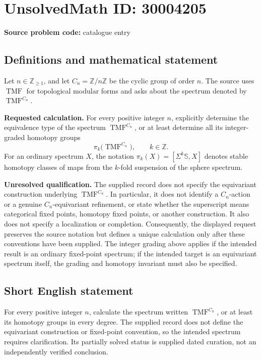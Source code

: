 \documentclass[11pt]{article}
\newcommand{\Z}{\mathbb{Z}}
\begin{document}
\section*{UnsolvedMath ID: 30004205}
\textbf{Source problem code:} catalogue entry
\subsection{Definitions and mathematical statement}
Let \(n\in\Z_{\geq 1}\), and let \(C_n=\Z/n\Z\) be the cyclic group of order \(n\). The source uses \(\operatorname{TMF}\) for topological modular forms and asks about the spectrum denoted by \(\operatorname{TMF}^{C_n}\).

\textbf{Requested calculation.} For every positive integer \(n\), explicitly determine the equivalence type of the spectrum \(\operatorname{TMF}^{C_n}\), or at least determine all its integer-graded homotopy groups
\[
\pi_k\bigl(\operatorname{TMF}^{C_n}\bigr),\qquad k\in\Z.
\]
For an ordinary spectrum \(X\), the notation \(\pi_k(X)=[\Sigma^k\mathbb S,X]\) denotes stable homotopy classes of maps from the \(k\)-fold suspension of the sphere spectrum.

\textbf{Unresolved qualification.} The supplied record does not specify the equivariant construction underlying \(\operatorname{TMF}^{C_n}\). In particular, it does not identify a \(C_n\)-action or a genuine \(C_n\)-equivariant refinement, or state whether the superscript means categorical fixed points, homotopy fixed points, or another construction. It also does not specify a localization or completion. Consequently, the displayed request preserves the source notation but defines a unique calculation only after these conventions have been supplied. The integer grading above applies if the intended result is an ordinary fixed-point spectrum; if the intended target is an equivariant spectrum itself, the grading and homotopy invariant must also be specified.
\subsection{Short English statement}
For every positive integer \(n\), calculate the spectrum written \(\operatorname{TMF}^{C_n}\), or at least its homotopy groups in every degree. The supplied record does not define the equivariant construction or fixed-point convention, so the intended spectrum requires clarification. Its partially solved status is supplied dated curation, not an independently verified conclusion.
\end{document}
